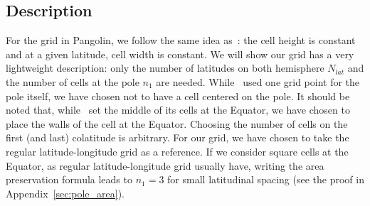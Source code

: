 \subsection{Description}
\label{subsubsec:description}
For the grid in Pangolin, we follow the same idea as~\cite{Kurihara1965}: the
cell height is constant and at a given latitude, cell width is constant.
We will show our grid has a very lightweight description: only the number of
latitudes on both hemisphere $N_{lat}$ and the number of cells at the pole $n_1$
are needed.
While~\cite{Kurihara1965} used one grid point for the pole itself, we have
chosen not to have a cell centered on the pole.
It should be noted that, while~\cite{Kurihara1965} set the middle of
its cells at the Equator, we have chosen to place the walls of the cell at the
Equator.
Choosing the number of cells on the first (and last) colatitude is arbitrary.
For our grid, we have chosen to take the regular latitude-longitude grid as a
reference. If we consider square cells at the Equator, as regular
latitude-longitude grid usually have, writing the area preservation formula
leads to $n_1 = 3$ for small latitudinal spacing (see the proof in
Appendix~\ref{sec:pole_area}).

